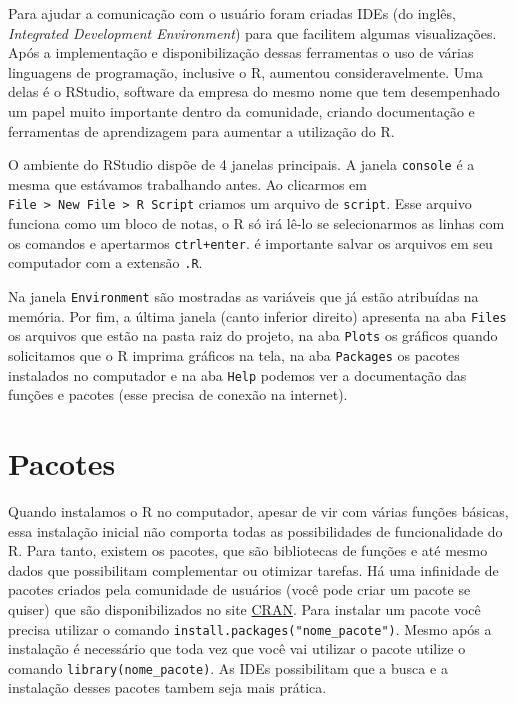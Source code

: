 \documentclass[]{book}
\theoremstyle{definition}
\theoremstyle{definition}
\theoremstyle{definition}
\theoremstyle{remark}
\begin{document}
Para ajudar a comunicação com o usuário foram criadas IDEs (do inglês, \emph{Integrated Development Environment}) para que facilitem algumas visualizações. Após a implementação e disponibilização dessas ferramentas o uso de várias linguagens de programação, inclusive o R, aumentou consideravelmente. Uma delas é o RStudio, software da empresa do mesmo nome que tem desempenhado um papel muito importante dentro da comunidade, criando documentação e ferramentas de aprendizagem para aumentar a utilização do R.

O ambiente do RStudio dispõe de 4 janelas principais. A janela \texttt{console} é a mesma que estávamos trabalhando antes. Ao clicarmos em \texttt{File\ \textgreater{}\ New\ File\ \textgreater{}\ R\ Script} criamos um arquivo de \texttt{script}. Esse arquivo funciona como um bloco de notas, o R só irá lê-lo se selecionarmos as linhas com os comandos e apertarmos \texttt{ctrl+enter}. é importante salvar os arquivos em seu computador com a extensão \texttt{.R}.

Na janela \texttt{Environment} são mostradas as variáveis que já estão atribuídas na memória. Por fim, a última janela (canto inferior direito) apresenta na aba \texttt{Files} os arquivos que estão na pasta raiz do projeto, na aba \texttt{Plots} os gráficos quando solicitamos que o R imprima gráficos na tela, na aba \texttt{Packages} os pacotes instalados no computador e na aba \texttt{Help} podemos ver a documentação das funções e pacotes (esse precisa de conexão na internet).

\hypertarget{pacotes}{%
\section{Pacotes}\label{pacotes}}

Quando instalamos o R no computador, apesar de vir com várias funções básicas, essa instalação inicial não comporta todas as possibilidades de funcionalidade do R. Para tanto, existem os pacotes, que são bibliotecas de funções e até mesmo dados que possibilitam complementar ou otimizar tarefas.
Há uma infinidade de pacotes criados pela comunidade de usuários (você pode criar um pacote se quiser) que são disponibilizados no site \href{https://cran.r-project.org/}{CRAN}. Para instalar um pacote você precisa utilizar o comando \texttt{install.packages("nome\_pacote")}.
Mesmo após a instalação é necessário que toda vez que você vai utilizar o pacote utilize o comando \texttt{library(nome\_pacote)}. As IDEs possibilitam que a busca e a instalação desses pacotes tambem seja mais prática.
\end{document}
